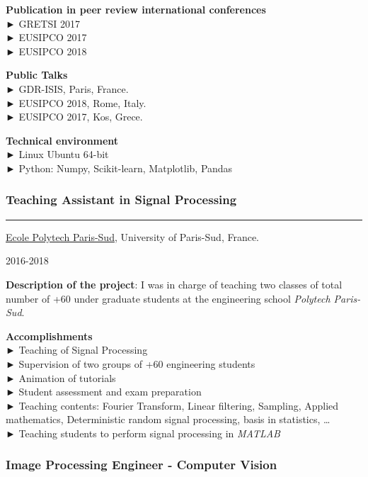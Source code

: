 \documentclass[
]{article}
\begin{document}
\textbf{Publication in peer review international conferences}\\
► GRETSI 2017\\
► EUSIPCO 2017\\
► EUSIPCO 2018

\textbf{Public Talks}\\
► GDR-ISIS, Paris, France.\\
► EUSIPCO 2018, Rome, Italy.\\
► EUSIPCO 2017, Kos, Grece.

\textbf{Technical environment}\\
► Linux Ubuntu 64-bit\\
► Python: Numpy, Scikit-learn, Matplotlib, Pandas

\hypertarget{teaching-assistant-in-signal-processing}{%
\subsubsection{Teaching Assistant in Signal
Processing}\label{teaching-assistant-in-signal-processing}}

\begin{center}\rule{0.5\linewidth}{\linethickness}\end{center}

\href{http://www.polytech.u-psud.fr/fr/formations/electronique-et-systemes-robotises.html}{Ecole
Polytech Paris-Sud}, University of Paris-Sud, France.

2016-2018

\textbf{Description of the project}: I was in charge of teaching two
classes of total number of +60 under graduate students at the
engineering school \emph{Polytech Paris-Sud}.

\textbf{Accomplishments}\\
► Teaching of Signal Processing\\
► Supervision of two groups of +60 engineering students\\
► Animation of tutorials\\
► Student assessment and exam preparation\\
► Teaching contents: Fourier Transform, Linear filtering, Sampling,
Applied mathematics, Deterministic random signal processing, basis in
statistics, \ldots{}\\
► Teaching students to perform signal processing in \emph{MATLAB}

\hypertarget{image-processing-engineer---computer-vision}{%
\subsubsection{Image Processing Engineer - Computer
Vision}\label{image-processing-engineer---computer-vision}}
\end{document}
